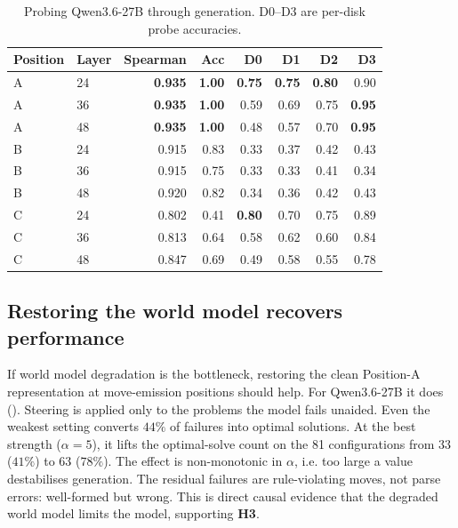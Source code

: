 \documentclass{article} %
\begin{document}
\begin{table}[t]
\centering
\caption{Probing Qwen3.6-27B through generation. D0--D3 are per-disk probe accuracies.}
\label{tab:posBC}
\begin{tabular}{llrrrrrr}
\toprule
\textbf{Position} & \textbf{Layer} & \textbf{Spearman} & \textbf{Acc} & \textbf{D0} & \textbf{D1} & \textbf{D2} & \textbf{D3} \\
\midrule
A & 24 & \textbf{0.935} & \textbf{1.00} & \textbf{0.75} & \textbf{0.75} & \textbf{0.80} & 0.90 \\
A & 36 & \textbf{0.935} & \textbf{1.00} & 0.59 & 0.69 & 0.75 & \textbf{0.95} \\
A & 48 & \textbf{0.935} & \textbf{1.00} & 0.48 & 0.57 & 0.70 & \textbf{0.95} \\
\midrule
B & 24 & 0.915 & 0.83 & 0.33 & 0.37 & 0.42 & 0.43 \\
B & 36 & 0.915 & 0.75 & 0.33 & 0.33 & 0.41 & 0.34 \\
B & 48 & 0.920 & 0.82 & 0.34 & 0.36 & 0.42 & 0.43 \\
\midrule
C & 24 & 0.802 & 0.41 & \textbf{0.80} & 0.70 & 0.75 & 0.89 \\
C & 36 & 0.813 & 0.64 & 0.58 & 0.62 & 0.60 & 0.84 \\
C & 48 & 0.847 & 0.69 & 0.49 & 0.58 & 0.55 & 0.78 \\
\bottomrule
\end{tabular}
\end{table}

\subsection{Restoring the world model recovers performance}
\label{sec:lrm-steering}

If world model degradation is the bottleneck, restoring the clean Position-A representation at move-emission positions should help. For Qwen3.6-27B it does (). Steering is applied only to the problems the model fails unaided. Even the weakest setting converts $44\%$ of failures into optimal solutions. At the best strength ($\alpha=5$), it lifts the optimal-solve count on the 81 configurations from $33$ ($41\%$) to $63$ ($78\%$). The effect is non-monotonic in $\alpha$, i.e. too large a value destabilises generation. The residual failures are rule-violating moves, not parse errors: well-formed but wrong. This is direct causal evidence that the degraded world model limits the model, supporting \textbf{H3}.
\end{document}
